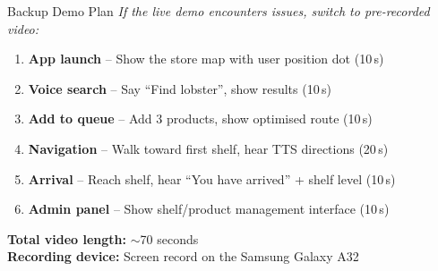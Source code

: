 \documentclass[aspectratio=169,12pt]{beamer}
\begin{document}
\begin{frame}{Backup Demo Plan}
\textit{If the live demo encounters issues, switch to pre-recorded video:}
\vspace{0.5em}
\begin{enumerate}
    \item \textbf{App launch} -- Show the store map with user position dot (10\,s)
    \item \textbf{Voice search} -- Say ``Find lobster'', show results (10\,s)
    \item \textbf{Add to queue} -- Add 3 products, show optimised route (10\,s)
    \item \textbf{Navigation} -- Walk toward first shelf, hear TTS directions (20\,s)
    \item \textbf{Arrival} -- Reach shelf, hear ``You have arrived'' + shelf level (10\,s)
    \item \textbf{Admin panel} -- Show shelf/product management interface (10\,s)
\end{enumerate}
\vspace{0.5em}
\textbf{Total video length:} $\sim$70 seconds\\
\textbf{Recording device:} Screen record on the Samsung Galaxy A32
\end{frame}
\end{document}
